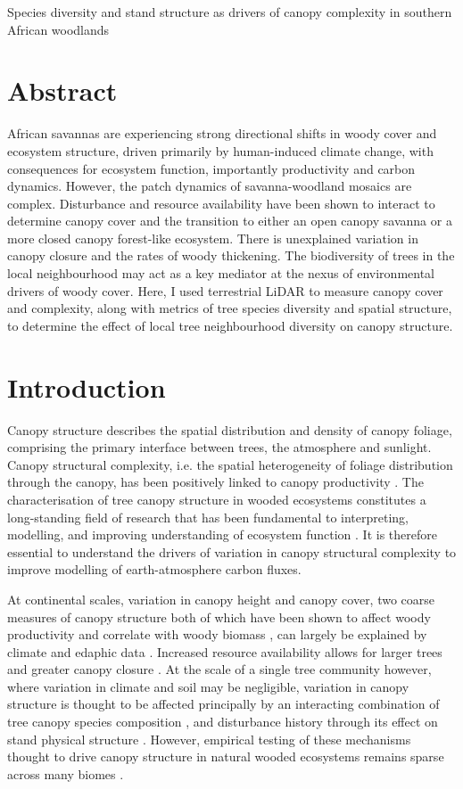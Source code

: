 \documentclass[11pt,a4paper]{article}
\newcommand{\titletext}{Species diversity and stand structure as drivers of canopy complexity in southern African woodlands}
\begin{document}
{\LARGE{\titletext{}}}

\linenumbers

\section*{Abstract}

African savannas are experiencing strong directional shifts in woody cover and ecosystem structure, driven primarily by human-induced climate change, with consequences for ecosystem function, importantly productivity and carbon dynamics. However, the patch dynamics of savanna-woodland mosaics are complex. Disturbance and resource availability have been shown to interact to determine canopy cover and the transition to either an open canopy savanna or a more closed canopy forest-like ecosystem. There is unexplained variation in canopy closure and the rates of woody thickening. The biodiversity of trees in the local neighbourhood may act as a key mediator at the nexus of environmental drivers of woody cover. Here, I used terrestrial LiDAR to measure canopy cover and complexity, along with metrics of tree species diversity and spatial structure, to determine the effect of local tree neighbourhood diversity on canopy structure.

\section{Introduction}

Canopy structure describes the spatial distribution and density of canopy foliage, comprising the primary interface between trees, the atmosphere and sunlight. Canopy structural complexity, i.e. the spatial heterogeneity of foliage distribution through the canopy, has been positively linked to canopy productivity \citep{Hardiman2011,Chen2012,Law2001,Baldocchi2001,Morin2015}. The characterisation of tree canopy structure in wooded ecosystems constitutes a long-standing field of research that has been fundamental to interpreting, modelling, and improving understanding of ecosystem function \citep{Watt1947, Whittaker1969, Horn1971, Maarel1996}. It is therefore essential to understand the drivers of variation in canopy structural complexity to improve modelling of earth-atmosphere carbon fluxes.

At continental scales, variation in canopy height and canopy cover, two coarse measures of canopy structure both of which have been shown to affect woody productivity and correlate with woody biomass \citep{}, can largely be explained by climate and edaphic data \citep{GEDI}. Increased resource availability allows for larger trees and greater canopy closure \citep{}. At the scale of a single tree community however, where variation in climate and soil may be negligible, variation in canopy structure is thought to be affected principally by an interacting combination of tree canopy species composition \citep{}, and disturbance history through its effect on stand physical structure \citep{}. However, empirical testing of these mechanisms thought to drive canopy structure in natural wooded ecosystems remains sparse across many biomes \citep{}.
\end{document}
